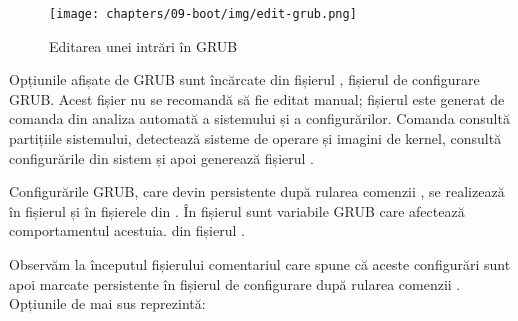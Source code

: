 \begin{figure}[!htbp]
  \centering
  \texttt{[image: chapters/09-boot/img/edit-grub.png]}
  \caption{Editarea unei intrări în GRUB}
  \label{fig:boot:edit-grub}
\end{figure}

Opțiunile afișate de GRUB sunt încărcate din fișierul ,
fișierul de configurare GRUB. Acest fișier nu se recomandă să fie editat manual;
fișierul este generat de comanda  din analiza automată a sistemului și a configurărilor.
Comanda  consultă
partițiile sistemului, detectează sisteme de operare și imagini de kernel,
consultă configurările din sistem și apoi generează fișierul
.

Configurările GRUB, care devin persistente după rularea comenzii , se
realizează în fișierul  și în fișierele din . În
fișierul  sunt variabile GRUB care afectează comportamentul
acestuia.  din fișierul .


Observăm la începutul fișierului comentariul care spune că aceste configurări
sunt apoi marcate persistente în fișierul de configurare 
după rularea comenzii . Opțiunile de mai sus reprezintă:

